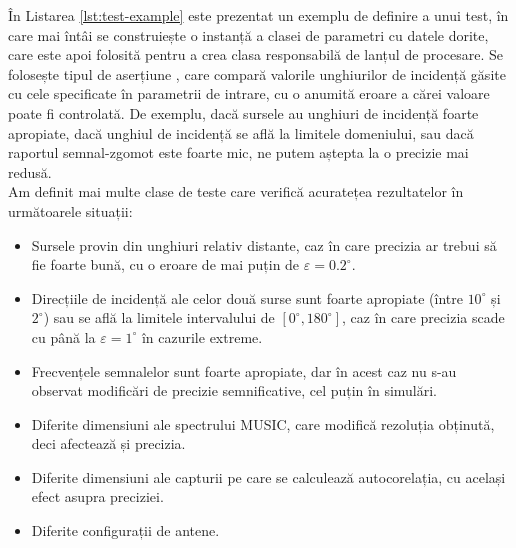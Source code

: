 În Listarea \ref{lst:test-example} este prezentat un exemplu de definire a unui
test, în care mai întâi se construiește o instanță a clasei de parametri cu
datele dorite, care este apoi folosită pentru a crea clasa responsabilă de
lanțul de procesare. Se folosește tipul de aserțiune , care
compară valorile unghiurilor de incidență găsite cu cele specificate în
parametrii de intrare, cu o anumită eroare a cărei valoare poate fi controlată.
De exemplu, dacă sursele au unghiuri de incidență foarte apropiate, dacă
unghiul de incidență se află la limitele domeniului, sau dacă raportul
semnal-zgomot este foarte mic, ne putem aștepta la o precizie mai redusă. \\

Am definit mai multe clase de teste care verifică acuratețea rezultatelor în
următoarele situații:
\begin{itemize}
  \item Sursele provin din unghiuri relativ distante, caz în care precizia ar
  trebui să fie foarte bună, cu o eroare de mai puțin de $\varepsilon = 0.2^{\circ}$.
  \item Direcțiile de incidență ale celor două surse sunt foarte apropiate
  (între $10^{\circ}$ și $2^{\circ}$) sau se află la limitele intervalului de
  $[0^{\circ}, 180^{\circ}]$, caz în care precizia scade cu până la $\varepsilon =
  1^{\circ}$ în cazurile extreme.
  \item Frecvențele semnalelor sunt foarte apropiate, dar în acest caz nu s-au
  observat modificări de precizie semnificative, cel puțin în simulări.
  \item Diferite dimensiuni ale spectrului MUSIC, care modifică rezoluția
  obținută, deci afectează și precizia.
  \item Diferite dimensiuni ale capturii pe care se calculează autocorelația,
  cu același efect asupra preciziei.
  \item Diferite configurații de antene.
\end{itemize}

